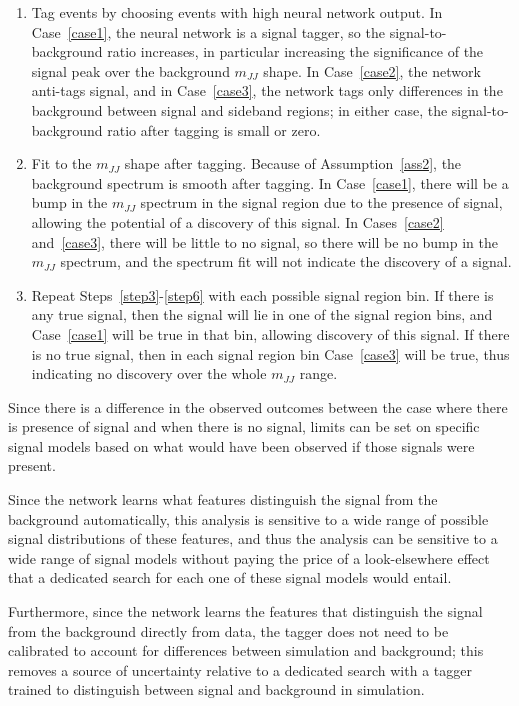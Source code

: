 \begin{enumerate}
  \label{step4}
  \item Tag events by choosing events with high neural network output.
    In Case~\ref{case1}, the neural network is a signal tagger, so the signal-to-background ratio increases, in particular increasing the significance of the signal peak over the background $m_{JJ}$ shape. 
    In Case~\ref{case2}, the network anti-tags signal, and in Case~\ref{case3}, the network tags only differences in the background between signal and sideband regions; in either case, the signal-to-background ratio after tagging is small or zero.
  \item Fit to the $m_{JJ}$ shape after tagging.
    Because of Assumption~\ref{ass2}, the background spectrum is smooth after tagging.
    In Case~\ref{case1}, there will be a bump in the $m_{JJ}$ spectrum in the signal region due to the presence of signal, allowing the potential of a discovery of this signal.
    In Cases~\ref{case2} and~\ref{case3}, there will be little to no signal, so there will be no bump in the $m_{JJ}$ spectrum, and the spectrum fit will not indicate the discovery of a signal.
    \label{step6}
  \item Repeat Steps~\ref{step3}-\ref{step6} with each possible signal region bin.
    If there is any true signal, then the signal will lie in one of the signal region bins, and Case~\ref{case1} will be true in that bin, allowing discovery of this signal.
    If there is no true signal, then in each signal region bin Case~\ref{case3} will be true, thus indicating no discovery over the whole $m_{JJ}$ range.
\end{enumerate}
Since there is a difference in the observed outcomes between the case where there is presence of signal and when there is no signal, limits can be set on specific signal models based on what would have been observed if those signals were present.

Since the network learns what features distinguish the signal from the background automatically, this analysis is sensitive to a wide range of possible signal distributions of these features, and thus the analysis can be sensitive to a wide range of signal models without paying the price of a look-elsewhere effect that a dedicated search for each one of these signal models would entail.

Furthermore, since the network learns the features that distinguish the signal from the background directly from data, the tagger does not need to be calibrated to account for differences between simulation and background; this removes a source of uncertainty relative to a dedicated search with a tagger trained to distinguish between signal and background in simulation.

